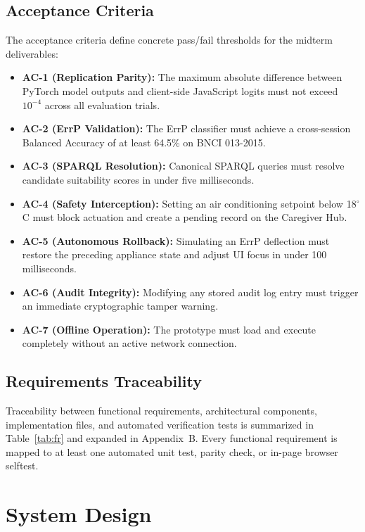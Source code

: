 \documentclass[12pt,a4paper]{report}
\begin{document}
\section{Acceptance Criteria}
The acceptance criteria define concrete pass/fail thresholds for the midterm deliverables:
\begin{itemize}[leftmargin=1.5em]
    \item \textbf{AC-1 (Replication Parity):} The maximum absolute difference between PyTorch model outputs and client-side JavaScript logits must not exceed $10^{-4}$ across all evaluation trials.
    \item \textbf{AC-2 (ErrP Validation):} The ErrP classifier must achieve a cross-session Balanced Accuracy of at least 64.5\% on BNCI 013-2015.
    \item \textbf{AC-3 (SPARQL Resolution):} Canonical SPARQL queries must resolve candidate suitability scores in under five milliseconds.
    \item \textbf{AC-4 (Safety Interception):} Setting an air conditioning setpoint below 18$^\circ$C must block actuation and create a pending record on the Caregiver Hub.
    \item \textbf{AC-5 (Autonomous Rollback):} Simulating an ErrP deflection must restore the preceding appliance state and adjust UI focus in under 100 milliseconds.
    \item \textbf{AC-6 (Audit Integrity):} Modifying any stored audit log entry must trigger an immediate cryptographic tamper warning.
    \item \textbf{AC-7 (Offline Operation):} The prototype must load and execute completely without an active network connection.
\end{itemize}

\section{Requirements Traceability}
Traceability between functional requirements, architectural components, implementation files, and automated verification tests is summarized in Table~\ref{tab:fr} and expanded in Appendix~B. Every functional requirement is mapped to at least one automated unit test, parity check, or in-page browser selftest.

\chapter{System Design}
\end{document}
